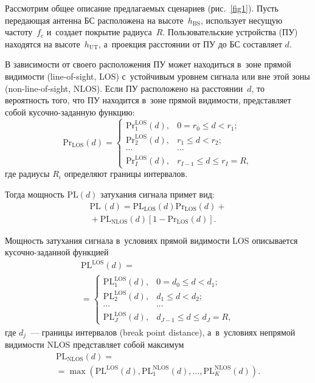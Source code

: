 \begin{multicols}{2}
Рассмотрим общее описание предлагаемых сценариев (рис.~\ref{fig1}). Пусть 
передающая антенна БС расположена на высоте~$h_{\mathrm{BS}}$, 
использует несущую частоту~$f_c$ и~создает покрытие радиуса~$R$. 
Пользовательские устройства (ПУ) находятся на высоте~$h_{\mathrm{UT}}$, а~проекция 
расстоянии от ПУ до БС со\-став\-ля\-ет $d$.

В зависимости от своего расположения ПУ может находиться в~зоне прямой видимости 
(line-of-sight, LOS) с~устойчивым уровнем сигнала или вне этой зоны (non-line-of-sight, NLOS). 
Если ПУ расположено на расстоянии~$d$, то ве\-ро\-ят\-ность того, что 
ПУ находится в~зоне прямой видимости, пред\-став\-ля\-ет собой кусочно-заданную 
функцию:
\begin{equation}
\label{eq1}
{\mathrm{Pr}}_{\mathrm{LOS}}(d)=
\begin{cases}
{\mathrm{Pr}}_1^{\mathrm{LOS}}(d), & 0=r_0 \leq d < r_1; \\
{\mathrm{Pr}}_2^{\mathrm{LOS}}(d), & r_1 \leq d < r_2; \\
\cdots & \cdots \\
{\mathrm{Pr}}_I^{\mathrm{LOS}}(d), & r_{I-1} \leq d \leq r_I=R,
\end{cases}
\end{equation}
где радиусы $R_i$ определяют границы интервалов. 

Тогда мощ\-ность $\mathrm{PL}(d)$ 
затухания сигнала примет вид:
\begin{multline}
\label{eq2}
\mathrm{PL}\,(d)= \mathrm{PL}_{\mathrm{LOS}}(d)  {\mathrm{Pr}}_{\mathrm{LOS}}(d) + {}\\
{}+\mathrm{PL}_{\mathrm{NLOS}}(d)  \left[1-
{\mathrm{Pr}}_{\mathrm{LOS}}(d)\right].
\end{multline}

Мощность затухания сигнала в~условиях прямой видимости LOS описывается ку\-соч\-но-за\-дан\-ной функцией
\begin{multline}
\label{eq3}
\mathrm{PL}^{\mathrm{LOS}}(d)={}\\
{}=
\begin{cases}
\mathrm{PL}_1^{\mathrm{LOS}}(d), & 0=d_0 \leq d < d_1;\\
\mathrm{PL}_2^{\mathrm{LOS}}(d), & d_1 \leq d < d_2;\\
\cdots & \cdots \\
\mathrm{PL}_J^{\mathrm{LOS}}(d), & d_{J-1} \leq d \leq d_J=R,
\end{cases}
\end{multline}
где $d_j$~--- границы интервалов (break point distance), а~в~условиях непрямой 
видимости NLOS пред\-став\-ля\-ет собой максимум
\begin{multline}
\label{eq4}
\mathrm{PL}_{\mathrm{NLOS}}(d) = {}\\
\!\!{}=\!
\max\left(\mathrm{PL}^{\mathrm{LOS}}(d),\mathrm{PL}^{\mathrm{NLOS}}_1(d), \ldots, \mathrm{PL}^{\mathrm{NLOS}}_K(d)\right)\!.\!\!
\end{multline}


\end{multicols}

